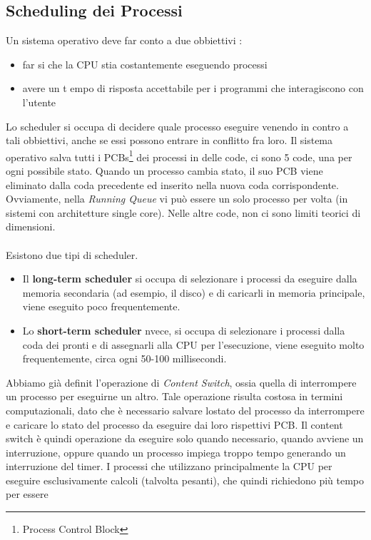 \documentclass[12pt, letterpaper]{article}
\begin{document}
\subsection{Scheduling dei Processi}
Un sistema operativo deve far conto a due obbiettivi : \begin{itemize}
    \item far si che la CPU stia costantemente eseguendo processi 
    \item avere un t empo di risposta accettabile per i programmi che interagiscono con l'utente
\end{itemize}
Lo scheduler si occupa di decidere quale processo eseguire venendo in contro a tali obbiettivi, anche se 
essi possono entrare in conflitto fra loro. Il sistema operativo salva tutti i PCBs\footnote{
 Process Control Block
} dei processi in delle code, ci sono 5 code, una per ogni possibile stato. Quando un processo cambia stato, 
il suo PCB viene eliminato dalla coda precedente ed inserito nella nuova coda corrispondente. Ovviamente, 
nella \textit{Running Queue} vi può essere un solo processo per volta (in sistemi con architetture single core).
Nelle altre code, non ci sono limiti teorici di dimensioni.
\\\hphantom{}\\ 
Esistono due tipi di scheduler.\begin{itemize}
    \item Il \textbf{long-term scheduler} si occupa di selezionare i processi da eseguire dalla memoria secondaria 
    (ad esempio, il disco) e di caricarli in memoria principale, viene eseguito poco frequentemente.
    \item Lo \textbf{short-term scheduler} nvece, si occupa di selezionare i
     processi dalla coda dei pronti e di assegnarli alla CPU per l'esecuzione, viene eseguito molto frequentemente,
     circa ogni 50-100 millisecondi.
\end{itemize}
Abbiamo già definit l'operazione di \textit{Content Switch}, ossia quella di interrompere un processo per 
eseguirne un altro. Tale operazione risulta costosa in termini computazionali, dato che è necessario salvare 
lostato del processo da interrompere e caricare lo stato del processo da eseguire dai loro rispettivi 
PCB. Il content switch è quindi operazione da eseguire solo quando necessario, quando avviene un interruzione, oppure 
quando un processo impiega troppo tempo generando un interruzione del timer. I processi che utilizzano principalmente 
la CPU per eseguire esclusivamente calcoli (talvolta pesanti), che quindi richiedono più tempo per essere 
\end{document}
